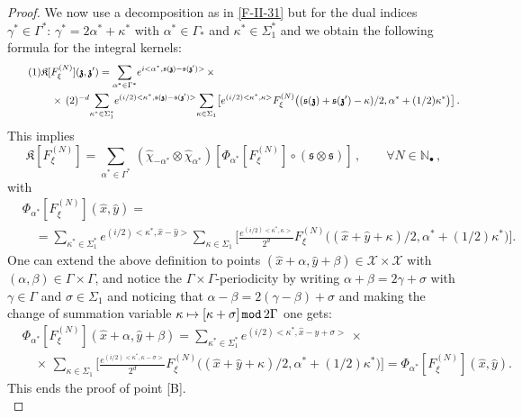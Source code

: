 \documentclass[12pt]{article}
\theoremstyle{definition}
\newcommand\numberthis{\addtocounter{equation}{1}\tag{\theequation}}
\def\X{\mathcal X}
\def\s{\mathfrak{s}}
\def\bz{\mathfrak{z}\hspace*{-4pt}\mathfrak{z}}
\def\Nb{\mathbb{N}_{\bullet}}
\def\beq{\begin{equation}}
\def\eeq{\end{equation}}
\numberwithin{equation}{section}
\begin{document}
\begin{proof}
We now use a decomposition as in \eqref{F-II-31} but for the dual indices $\gamma^*\in\Gamma^*$: 
$\gamma^*=2\alpha^*+\kappa^*$ with $\alpha^*\in\Gamma_*$ and $\kappa^*\in\Sigma_1^*$ and we obtain the following formula for the integral kernels:
\begin{align*}\numberthis\label{F-53-1}
&\mathfrak{K}[F^{(N)}_\xi](\bz,\bz^\prime)=\underset{\alpha^*\in\Gamma^*}{\sum}e^{i<\alpha^*,\s(\bz)-\s(\bz^\prime)>}\,\times\\
&\quad\times\,(2)^{-d}\underset{\kappa^*\in\Sigma_1^*}{\sum}e^{(i/2)<\kappa^*,\s(\bz)-\s(\bz^\prime)>}\underset{\kappa\in\Sigma_1}{\sum}\big[e^{(i/2)<\kappa^*,\kappa>}F^{(N)}_\xi\big((\s(\bz)+\s(\bz^\prime)-\kappa)/2,\alpha^*+(1/2)\kappa^*\big)\big]\,.
\end{align*}
This implies
\beq
\mathfrak{K}[F^{(N)}_\xi]=\underset{\alpha^*\in\Gamma^*}{\sum}\,(\hat{\chi}_{-\alpha^*}\otimes\hat{\chi}_{\alpha^*})[\Phi_{\alpha^*}[F^{(N)}_\xi]\circ(\s\otimes\s)]\,,\qquad\forall{N}\in\Nb\,,
\eeq
with
\begin{align}\label{F-53-2}
	&\Phi_{\alpha^*}[F^{(N)}_\xi](\hat{x},\hat{y})=\\ \nonumber
    &\quad=\underset{\kappa^*\in\Sigma_1^*}{\sum}e^{(i/2)<\kappa^*,\hat{x}-\hat{y}>}\underset{\kappa\in\Sigma_1}{\sum}\big[\frac{e^{(i/2)<\kappa^*,\kappa>}}{2^d}F^{(N)}_\xi\big((\hat{x}+\hat{y}+\kappa)/2,\alpha^*+(1/2)\kappa^*\big)\big].
\end{align}
One can extend the above definition to points $(\hat{x}+\alpha,\hat{y}+\beta)\in\X\times\X$ with $(\alpha,\beta)\in\Gamma\times\Gamma$, and notice the $\Gamma\times\Gamma$-periodicity by writing $\alpha+\beta=2\gamma+\sigma$ with $\gamma\in\Gamma$ and $\sigma\in\Sigma_1$ and noticing that $\alpha-\beta=2(\gamma-\beta)+\sigma$ and making the change of summation variable $\kappa\mapsto[\kappa+\sigma]\, \text{\tt mod}\,2\Gamma$ one gets:
\begin{align}
&\Phi_{\alpha^*}[F^{(N)}_\xi](\hat{x}+\alpha,\hat{y}+\beta)=\underset{\kappa^*\in\Sigma_1^*}{\sum}e^{(i/2)<\kappa^*,\hat{x}-\hat{y}+\sigma>}\,\times\\ \nonumber
&\quad\times\,\underset{\kappa\in\Sigma_1}{\sum}\big[\frac{e^{(i/2)<\kappa^*,\kappa-\sigma>}}{2^d}F^{(N)}_\xi\big((\hat{x}+\hat{y}+\kappa)/2,\alpha^*+(1/2)\kappa^*\big)\big]=\Phi_{\alpha^*}[F^{(N)}_\xi](\hat{x},\hat{y}).
\end{align}
This ends the proof of point [B].\\


\end{proof}
\end{document}
